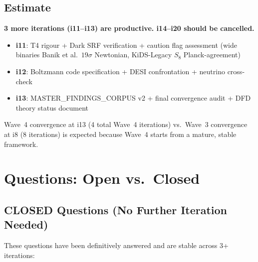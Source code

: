 \documentclass[11pt]{article}
\begin{document}
\subsection{Estimate}

\begin{tcolorbox}[colback=green!5!white, colframe=green!50!black,
  title=\textbf{ITERATION ESTIMATE}]

\textbf{3 more iterations (i11--i13) are productive. i14--i20 should be
cancelled.}

\begin{itemize}[nosep]
\item \textbf{i11}: T4 rigour + Dark SRF verification + caution flag assessment
  (wide binaries Banik et al.\ $19\sigma$ Newtonian, KiDS-Legacy $S_8$
  Planck-agreement)
\item \textbf{i12}: Boltzmann code specification + DESI confrontation +
  neutrino cross-check
\item \textbf{i13}: MASTER\_FINDINGS\_CORPUS v2 + final convergence audit +
  DFD theory status document
\end{itemize}

Wave~4 convergence at i13 (4 total Wave~4 iterations) vs.\ Wave~3
convergence at i8 (8 iterations) is expected because Wave~4 starts from
a mature, stable framework.
\end{tcolorbox}


\section{Questions: Open vs.\ Closed}
\label{sec:questions}

\subsection{CLOSED Questions (No Further Iteration Needed)}

These questions have been definitively answered and are stable across
3+ iterations:
\end{document}
